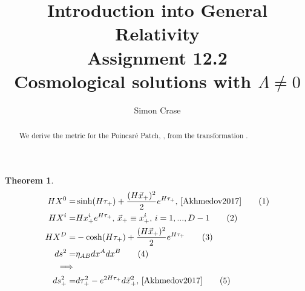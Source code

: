 \documentclass[]{article}
\title{Introduction into General Relativity\\Assignment 12.2\\Cosmological solutions with $\Lambda\ne 0$}
\author{Simon Crase}
\newtheorem{theorem}{Theorem}
\newcommand\numberthis{\addtocounter{equation}{1}\tag{\theequation}}
\begin{document}
\maketitle

\begin{abstract}
	We derive the metric for the Poincar\'e Patch, \cite[XII,(332)]{Akhmedov2017}, from the transformation \cite[XII,(333)]{Akhmedov2017}.
\end{abstract}

\begin{theorem}
	\begin{align*}
	HX^0=&\sinh(H\tau_+)+\frac{(H\vec{x}_+)^2}{2}e^{H\tau_+}\text{, \cite[XII,(333)]{Akhmedov2017}}\numberthis\label{eq:x0}\\
	HX^i=&Hx^i_+e^{H\tau_+},\, \vec{x}_+\equiv x^i_+,\, i=1,...,D-1\numberthis\label{eq:xi}\\
	HX^D=&-\cosh(H\tau_+)+\frac{(H\vec{x}_+)^2}{2}e^{H\tau_+}\numberthis\label{eq:xD}\\
	ds^2=&\eta_{AB}dx^Adx^B\numberthis\label{eq:ds}\\
	\implies&\\
	ds^2_+=&d\tau^2_+ - e^{2H\tau_+}d\vec{x}^2_+\text{, \cite[XII,(332)]{Akhmedov2017}}	\numberthis\label{eq:demonstandem}
	\end{align*}
\end{theorem}
\end{document}
